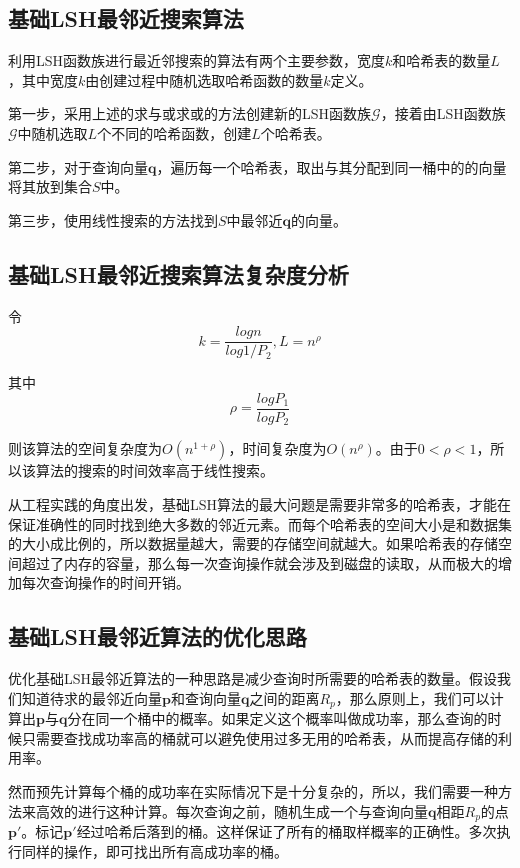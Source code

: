 \subsection{基础LSH最邻近搜索算法}

利用LSH函数族进行最近邻搜索的算法有两个主要参数，宽度$k$和哈希表的数量$L$，其中宽度$k$由创建过程中随机选取哈希函数的数量$k$定义。

第一步，采用上述的求与或求或的方法创建新的LSH函数族$\mathcal{G}$，接着由LSH函数族$\mathcal{G}$中随机选取$L$个不同的哈希函数，创建$L$个哈希表。

第二步，对于查询向量$\mathbf{q}$，遍历每一个哈希表，取出与其分配到同一桶中的的向量将其放到集合$S$中。

第三步，使用线性搜索的方法找到$S$中最邻近$\mathbf{q}$的向量。

\subsection{基础LSH最邻近搜索算法复杂度分析}
令
\begin{equation}
	k=\frac{log n}{log 1/P_2},L=n^\rho
\end{equation}

其中
\begin{equation}
	\rho =\frac{log P_1}{log P_2}
\end{equation}

则该算法的空间复杂度为$O(n^{1+\rho})$，时间复杂度为$O(n^\rho)$。由于$0<\rho <1$，所以该算法的搜索的时间效率高于线性搜索。

从工程实践的角度出发，基础LSH算法的最大问题是需要非常多的哈希表，才能在保证准确性的同时找到绝大多数的邻近元素。而每个哈希表的空间大小是和数据集的大小成比例的，所以数据量越大，需要的存储空间就越大。如果哈希表的存储空间超过了内存的容量，那么每一次查询操作就会涉及到磁盘的读取，从而极大的增加每次查询操作的时间开销。

\subsection{基础LSH最邻近算法的优化思路}

优化基础LSH最邻近算法的一种思路是减少查询时所需要的哈希表的数量。假设我们知道待求的最邻近向量$\mathbf{p}$和查询向量$\mathbf{q}$之间的距离$R_p$，那么原则上，我们可以计算出$\mathbf{p}$与$\mathbf{q}$分在同一个桶中的概率。如果定义这个概率叫做成功率，那么查询的时候只需要查找成功率高的桶就可以避免使用过多无用的哈希表，从而提高存储的利用率。

然而预先计算每个桶的成功率在实际情况下是十分复杂的，所以，我们需要一种方法来高效的进行这种计算。每次查询之前，随机生成一个与查询向量$\mathbf{q}$相距$R_p$的点$\mathbf{p'}$。标记$\mathbf{p'}$经过哈希后落到的桶。这样保证了所有的桶取样概率的正确性。多次执行同样的操作，即可找出所有高成功率的桶。

